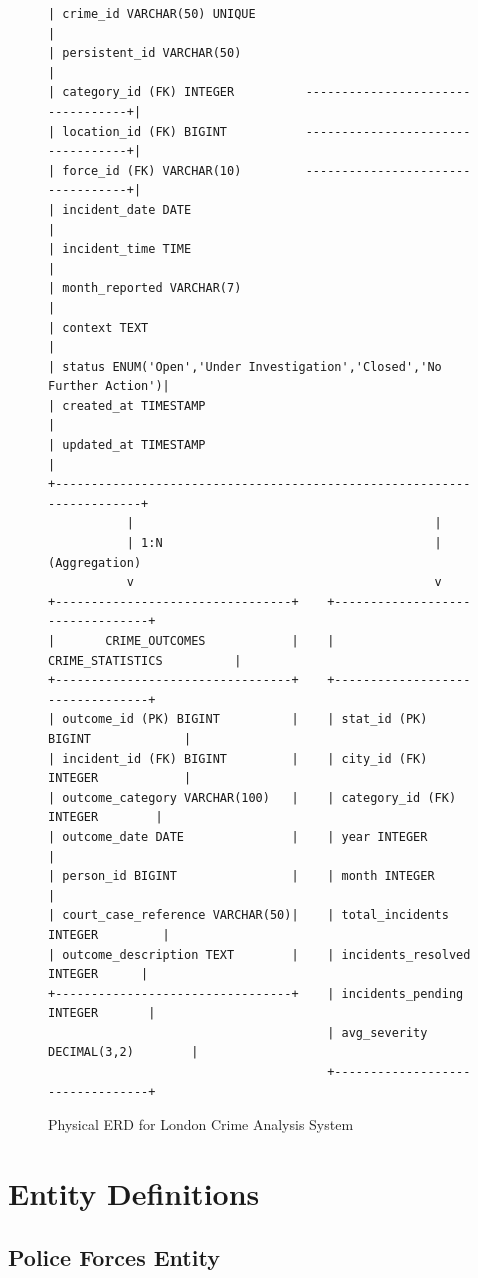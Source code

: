 \documentclass[12pt,a4paper]{article}
\begin{document}
\begin{figure}[h]
\begin{verbatim}
| crime_id VARCHAR(50) UNIQUE                                           |
| persistent_id VARCHAR(50)                                             |
| category_id (FK) INTEGER          ----------------------------------+|
| location_id (FK) BIGINT           ----------------------------------+|
| force_id (FK) VARCHAR(10)         ----------------------------------+|
| incident_date DATE                                                    |
| incident_time TIME                                                    |
| month_reported VARCHAR(7)                                             |
| context TEXT                                                          |
| status ENUM('Open','Under Investigation','Closed','No Further Action')|
| created_at TIMESTAMP                                                  |
| updated_at TIMESTAMP                                                  |
+-----------------------------------------------------------------------+
           |                                          |
           | 1:N                                      | (Aggregation)
           v                                          v
+---------------------------------+    +---------------------------------+
|       CRIME_OUTCOMES            |    |       CRIME_STATISTICS          |
+---------------------------------+    +---------------------------------+
| outcome_id (PK) BIGINT          |    | stat_id (PK) BIGINT             |
| incident_id (FK) BIGINT         |    | city_id (FK) INTEGER            |
| outcome_category VARCHAR(100)   |    | category_id (FK) INTEGER        |
| outcome_date DATE               |    | year INTEGER                    |
| person_id BIGINT                |    | month INTEGER                   |
| court_case_reference VARCHAR(50)|    | total_incidents INTEGER         |
| outcome_description TEXT        |    | incidents_resolved INTEGER      |
+---------------------------------+    | incidents_pending INTEGER       |
                                       | avg_severity DECIMAL(3,2)        |
                                       +---------------------------------+
\end{verbatim}
\caption{Physical ERD for London Crime Analysis System}
\end{figure}

\section{Entity Definitions}

\subsection{Police Forces Entity}
\end{document}
